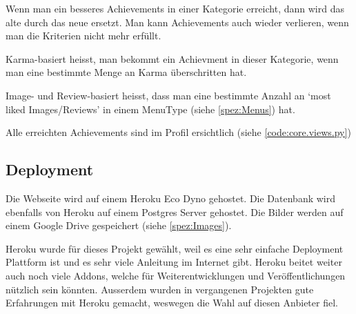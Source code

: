 Wenn man ein besseres Achievements in einer Kategorie erreicht, dann wird das
alte durch das neue ersetzt. Man kann Achievements auch wieder verlieren, wenn
man die Kriterien nicht mehr erfüllt.

Karma-basiert heisst, man bekommt ein Achievment in dieser Kategorie, wenn man
eine bestimmte Menge an Karma überschritten hat.

Image- und Review-basiert heisst, dass man eine bestimmte Anzahl an `most liked
Images/Reviews' in einem MenuType (siehe \ref{spez:Menus}) hat.

Alle erreichten Achievements sind im Profil ersichtlich (siehe \ref{code:core.views.py})

\subsection{Deployment} \label{spez:Deployment}

Die Webseite wird auf einem Heroku Eco Dyno gehostet. Die Datenbank wird ebenfalls
von Heroku auf einem Postgres Server gehostet. Die Bilder werden auf einem
Google Drive gespeichert (siehe \ref{spez:Images}).

Heroku wurde für dieses Projekt gewählt, weil es eine sehr einfache
 Deployment Plattform ist und es sehr viele Anleitung im Internet
gibt. Heroku beitet weiter auch noch viele Addons, welche für
Weiterentwicklungen und Veröffentlichungen nützlich sein könnten. Ausserdem
wurden in vergangenen Projekten gute Erfahrungen mit Heroku gemacht, weswegen
die Wahl auf diesen Anbieter fiel.
